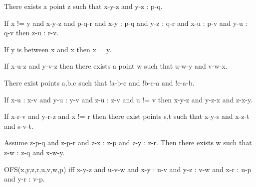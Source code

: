 \documentclass{article}
\begin{document}
\begin{forthel}
    \begin{axiom}[A4]
      There exists a point z such that x-y-z and y-z : p-q.
    \end{axiom}

    \begin{axiom}[A5]
      If x != y and x-y-z and p-q-r and x-y : p-q and y-z : q-r and x-u : p-v
      and y-u : q-v then z-u : r-v.
    \end{axiom}

    \begin{axiom}[A6]
      If y is between x and x then x = y.
    \end{axiom}

    \begin{axiom}[A7]
      If x-u-z and y-v-z then there exists a point w such that u-w-y and v-w-x.
    \end{axiom}

    \begin{axiom}[A8]
      There exist points a,b,c such that !a-b-c and !b-c-a and !c-a-b.
    \end{axiom}

    \begin{axiom}[A9]
      If x-u : x-v and y-u : y-v and  z-u : z-v and u != v then x-y-z and y-z-x
      and z-x-y.
    \end{axiom}

    \begin{axiom}[A10]
      If x-r-v and y-r-z and x != r then there exist points s,t such that x-y-s
      and x-z-t and s-v-t.
    \end{axiom}

    \begin{axiom}[CA]
      Assume z-p-q and z-p-r and z-x : z-p and z-y : z-r. Then there exists w
      such that z-w : z-q and x-w-y.
    \end{axiom}


    \begin{definition}[OFS]
      OFS(x,y,z,r,u,v,w,p) iff x-y-z and u-v-w and x-y : u-v and y-z : v-w and
      x-r : u-p and y-r : v-p.
    \end{definition}


\end{forthel}
\end{document}
